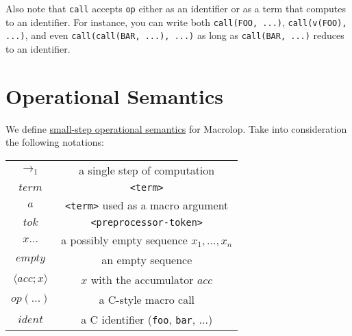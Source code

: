 \documentclass[a4paper, 12pt]{article}
\begin{document}
Also note that \texttt{call} accepts \texttt{op} either as an identifier or as
a term that computes to an identifier. For instance, you can write both
\texttt{call(FOO, ...)}, \texttt{call(v(FOO), ...)}, and even
\texttt{call(call(BAR, ...), ...)} as long as \texttt{call(BAR, ...)} reduces to an
identifier.

\section{Operational Semantics}

We define
\href{https://en.wikipedia.org/wiki/Operational_semantics#Small-step_semantics}
{small-step operational semantics} for Macrolop. Take into consideration the following notations:

\begin{center}
    \begin{tabular}{ |c|c| }
        \hline
        $\rightarrow_1$ & a single step of computation \\
        $term$ & \texttt{<term>} \\
        $a$ & \texttt{<term>} used as a macro argument \\
        $tok$ & \texttt{<preprocessor-token>} \\
        $x \ldots$ & a possibly empty sequence $x_1, \ldots, x_n$ \\
        $empty$ & an empty sequence \\
        $\langle acc; x \rangle$ & $x$ with the accumulator $acc$ \\
        $op(...)$ & a C-style macro call \\
        $ident$ & a C identifier (\texttt{foo}, \texttt{bar}, ...) \\
        \hline
    \end{tabular}
\end{center}
\end{document}
